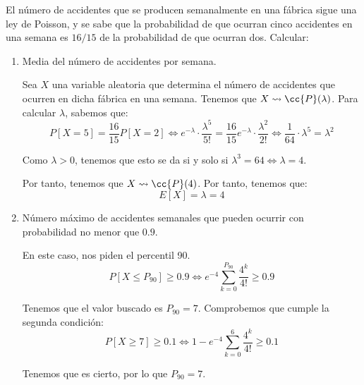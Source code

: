 \begin{ejercicio}
    El número de accidentes que se producen semanalmente en una fábrica sigue una ley de Poisson, y se sabe que la probabilidad de que ocurran cinco accidentes en una semana es $16/15$ de la probabilidad de que ocurran dos. Calcular:
    \begin{enumerate}
        \item Media del número de accidentes por semana.

        Sea $X$ una variable aleatoria que determina el número de accidentes que ocurren en dicha fábrica en una semana. Tenemos que $X\leadsto \cc{P}(\lambda)$. Para calcular $\lambda$, sabemos que:
        \begin{equation*}
            P[X=5]=\frac{16}{15}P[X=2] \Longleftrightarrow e^{-\lambda}\cdot \frac{\lambda^5}{5!} = \frac{16}{15} e^{-\lambda}\cdot \frac{\lambda^2}{2!}
            \Longleftrightarrow \frac{1}{64}\cdot \lambda^5 = \lambda^2
        \end{equation*}

        Como $\lambda>0$, tenemos que esto se da si y solo si $\lambda^3 = 64\Longleftrightarrow \lambda = 4$.

        Por tanto, tenemos que $X\leadsto \cc{P}(4)$. Por tanto, tenemos que:
        \begin{equation*}
            E[X]=\lambda=4
        \end{equation*}
        
        \item Número máximo de accidentes semanales que pueden ocurrir con probabilidad no menor que $0.9$.

        En este caso, nos piden el percentil 90.
        \begin{equation*}
            P[X\leq P_{90}]\geq 0.9 \Longleftrightarrow
            e^{-4}\sum_{k=0}^{P_{90}}\frac{4^k}{4!}\geq 0.9
        \end{equation*}

        Tenemos que el valor buscado es $P_{90}=7$. Comprobemos que cumple la segunda condición:
        \begin{equation*}
            P[X\geq 7]\geq 0.1 \Longleftrightarrow
            1 - e^{-4}\sum_{k=0}^{6}\frac{4^k}{4!}\geq 0.1
        \end{equation*}

        Tenemos que es cierto, por lo que $P_{90}=7$. 
    \end{enumerate}
\end{ejercicio}